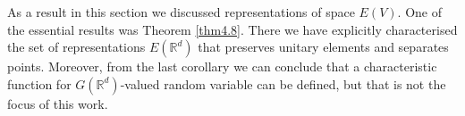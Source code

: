 \documentclass[12pt,a4paper]{report}
\theoremstyle{definition}
\newtheorem{definition}{Definition}
\begin{document}
As a result in this section we discussed representations of space $E(V)$. One of the essential results was Theorem \ref{thm4.8}. There we have explicitly characterised the set of representations $E(\mathbb{R}^d)$ that preserves unitary elements and separates points. Moreover, from the last corollary we can conclude that a characteristic function for $G(\mathbb{R}^d)$-valued random variable can be defined, but that is not the focus of this work. 






%
%
%
%
\end{document}
